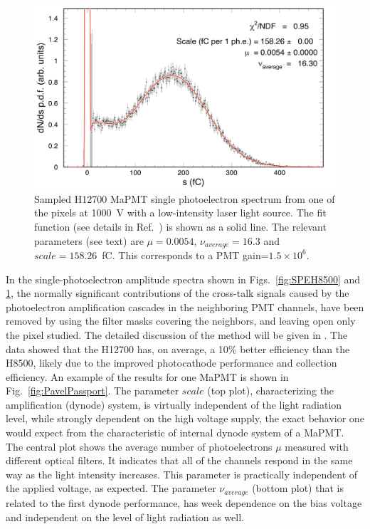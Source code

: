 \documentclass[5p,times,twocolumn]{elsarticle}
\def\MaPMT{MaPMT }
\begin{document}
\begin{figure}[ht]
	\centering
	\includegraphics[width=\linewidth]{H12700-r-W0-GA0982-w3-g064-v1000-t227-37.png}
	\caption{Sampled H12700 \MaPMT single photoelectron spectrum from one of the pixels at 1000~V with a low-intensity
          laser light source. The fit function (see details in Ref.~\cite{Pavel}) is shown as a solid line. 
          The relevant parameters (see text) are $\mu=0.0054$, $\nu_{average}=16.3$ and $scale=158.26$~fC. This corresponds
          to a PMT gain=$1.5 \times 10^6$.
          }
	\label{fig:SPEH12700}
\end{figure}

In the single-photoelectron amplitude spectra shown in Figs.~\ref{fig:SPEH8500} and \ref{fig:SPEH12700}, the normally significant contributions of the cross-talk signals caused by the photoelectron amplification cascades in the neighboring PMT channels, have been removed by using the filter masks covering the neighbors, and leaving open only the pixel studied. The detailed discussion of the method will be given in \cite{TBP}.
The data showed that the H12700 has, on average, a 10\% better efficiency than the H8500, likely due to the improved
photocathode performance and collection efficiency. An example of the results for one MaPMT is shown in
Fig.~\ref{fig:PavelPassport}. 
The parameter $scale$ (top plot), characterizing the amplification (dynode) system, is
virtually independent of the light radiation level, while strongly dependent on the high voltage supply, the exact behavior one would expect from the characteristic  of internal dynode system of a MaPMT. 
The central plot shows the average number of photoelectrons $\mu$ measured with different optical filters. 
It indicates that all of the channels respond in the same way as the light intensity increases. This parameter is practically independent of the applied voltage, as expected.
The parameter $\nu_{average}$ (bottom plot) that is related to the first dynode performance,  has week dependence on the bias voltage  and independent on the level of light radiation as well. 
\end{document}

